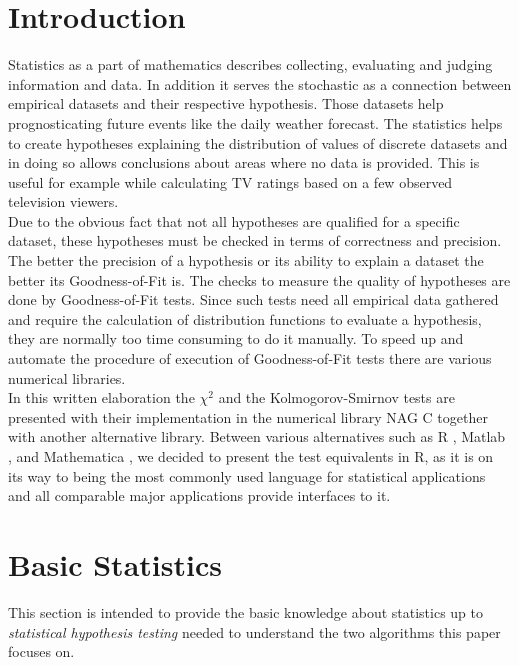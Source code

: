 \documentclass{article}
\theoremstyle{definition}
\begin{document}
\section{Introduction}
Statistics as a part of mathematics describes collecting, evaluating and judging information and data.
In addition it serves the stochastic as a connection between empirical datasets and their respective hypothesis.
Those datasets help prognosticating future events like the daily weather forecast. 
The statistics helps to create hypotheses explaining the distribution of values of discrete datasets and in doing so allows conclusions about areas where no data is provided.
This is useful for example while calculating TV ratings based on a few observed television viewers.
\\
Due to the obvious fact that not all hypotheses are qualified for a specific dataset, these hypotheses must be checked in terms of correctness and precision.
The better the precision of a hypothesis or its ability to explain a dataset the better its Goodness-of-Fit is.
The checks to measure the quality of hypotheses are done by Goodness-of-Fit tests.
Since such tests need all empirical data gathered and require the calculation of distribution functions to evaluate a hypothesis, they are normally too time consuming to do it manually.
To speed up and automate the procedure of execution of Goodness-of-Fit tests there are various numerical libraries.
\\
In this written elaboration the $\chi^2$ and the Kolmogorov-Smirnov tests are presented with their implementation in the numerical library NAG C together with another alternative library.
Between various alternatives such as R \cite{hellbrueck2009angewandte}, Matlab \cite{benker2001statistik}, and Mathematica \cite{jaeger1997statistik}, we decided to present the test equivalents in R, as it is on its way to being the most commonly used language for statistical applications and all comparable major applications provide interfaces to it.

\section{Basic Statistics}
This section is intended to provide the basic knowledge about statistics up to \emph{statistical hypothesis testing} needed to understand the two algorithms this paper focuses on.
\end{document}

